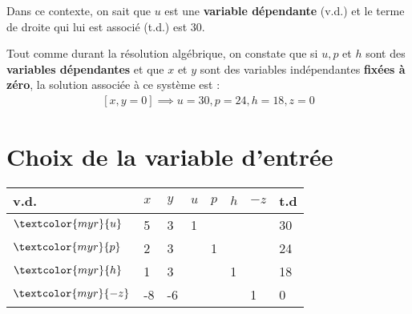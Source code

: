 \documentclass{report}
\begin{document}
\begin{multicols*}{2}
Dans ce contexte, on sait que $u$ est une \textbf{variable dépendante} (v.d.)  
et le terme de droite qui lui est associé (t.d.) est $30$. 



Tout comme durant la résolution algébrique, on constate que si $u, p$ et $h$ sont 
des \textbf{variables dépendantes} et que $x$ et $y$ sont des 
variables indépendantes \textbf{fixées à zéro}, la solution associée à ce système 
est : 
\begin{align*}
    \boxed{\left[ x, y = 0 \right] \implies u = 30, p = 24, h = 18, z = 0} 
\end{align*}

\section{Choix de la variable d'entrée}

        \begin{table}[H]
                \begin{center}
                    \renewcommand{\arraystretch}{1.5}
                    \selectfont
                    \footnotesize
                        \begin{tabular}{|l|l l l l l |l|l|}
                        \arrayrulecolor{blue}
                        \hline
                        v.d. & $x$
                             & $y$ & $u$ & $p$ & $h$ & $-z$ & t.d 
                        \\
                        \hline
                        \arrayrulecolor{black}
                        $\textcolor{myr}{u} 
                        $     & 5
                                & 3
                                & 1
                                & 
                                & &  &  30
                        \\
                        $\textcolor{myr}{p} $     
                               & 2
                               & 3
                               & & 1
                               & & & 24 
                        \\
                        $\textcolor{myr}{h} $     
                               & 1
                               & 3 
                               &  & 
                               &  1
                               & & 18 
                        \\ 
                        \hline
                        $\textcolor{myr}{-z}$ 
                               & \cellcolor{myr!40}-8
                                & -6
                                & 
                                & 
                                & 
                                & 1 & 0 
                        \\
                        \hline 




\end{tabular}
\end{center}
\end{table}
\end{multicols*}
\end{document}
